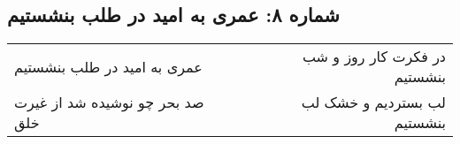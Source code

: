 \begin{center}
\section*{شماره ۸: عمری به امید در طلب بنشستیم}
\label{sec:008}
\begin{longtable}{l p{0.5cm} r}
عمری به امید در طلب بنشستیم
&&
در فکرت کار روز و شب بنشستیم
\\
صد بحر چو نوشیده شد از غیرت خلق
&&
لب بستردیم و خشک لب بنشستیم
\\
\end{longtable}
\end{center}
